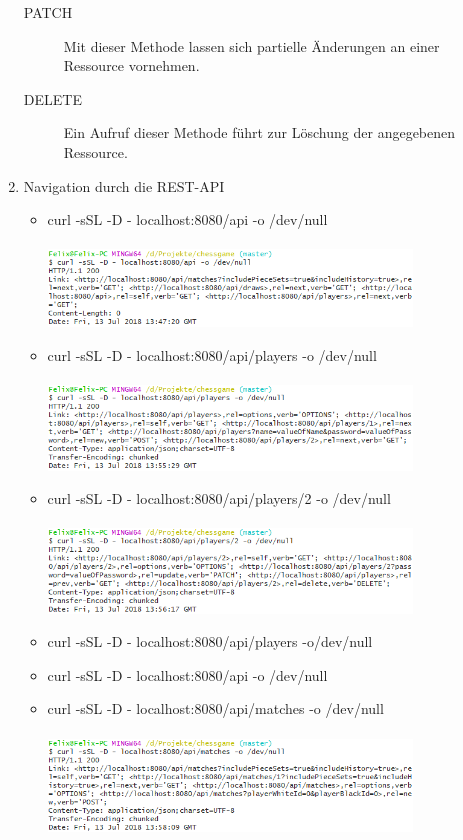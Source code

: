 \begin{enumerate}
\begin{description}
			\item[PATCH] Mit dieser Methode lassen sich partielle Änderungen an einer Ressource vornehmen.
			\item[DELETE] Ein Aufruf dieser Methode führt zur Löschung der angegebenen Ressource.
		\end{description}
	\newpage
	\item Navigation durch die \gls{REST}-\gls{API}
		\begin{itemize}
			\item curl -sSL -D - localhost:8080/api -o /dev/null\\
				\\
				\includegraphics[width=0.8\textwidth]{images/question3.1.png}
			\item curl -sSL -D - localhost:8080/api/players -o /dev/null\\
				\\
				\includegraphics[width=0.8\textwidth]{images/question3.2.png}
			\item curl -sSL -D - localhost:8080/api/players/2 -o /dev/null\\
				\\
				\includegraphics[width=0.8\textwidth]{images/question3.3.png}
			\item curl -sSL -D - localhost:8080/api/players -o/dev/null
			\item curl -sSL -D - localhost:8080/api -o /dev/null
			\item curl -sSL -D - localhost:8080/api/matches -o /dev/null\\
				\\
				\includegraphics[width=0.8\textwidth]{images/question3.6.png}

\end{itemize}
\end{enumerate}
